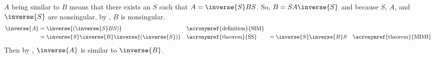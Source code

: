$A$ being similar to $B$ means that there exists an $S$ such that $A=\inverse{S}BS$. So, $B=SA\inverse{S}$ and because $S$, $A$, and $\inverse{S}$ are nonsingular, by , $B$ is nonsingular.
%
\begin{align*}
\inverse{A}
&= \inverse{\left(\inverse{S}BS\right)}
&&\text{\acronymref{definition}{SIM}}\\
%
&= \inverse{S}\inverse{B}\inverse{\left(\inverse{S}\right)}
&&\text{\acronymref{theorem}{SS}}
%
&= \inverse{S}\inverse{B}S
&&\text{\acronymref{theorem}{MIMI}}
%
\end{align*}
%
Then by , $\inverse{A}$ is similar to $\inverse{B}$.